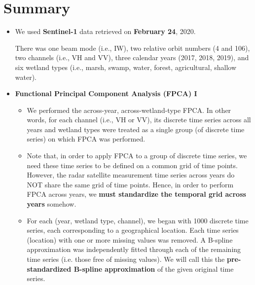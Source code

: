 
\vskip -1.5cm

\section{Summary}
\setcounter{theorem}{0}

\renewcommand{\theenumi}{\roman{enumi}}
\renewcommand{\labelenumi}{\textnormal{(\theenumi)}$\;\;$}


\begin{itemize}
\item
	We used \textbf{\color{red}Sentinel-1} data retrieved on \textbf{\color{red}February 24}, 2020.

	There was one beam mode (i.e., IW),
	two relative orbit numbers (4 and 106),
	two channels (i.e., VH and VV),
	three calendar years (2017, 2018, 2019), and
	six wetland types (i.e., marsh, swamp, water, forest, agricultural, shallow water).

\item
	\textbf{Functional Principal Component Analysis (FPCA) I}
	\begin{itemize}

	\item
		We performed the across-year, across-wetland-type FPCA.
		In other words, for each channel (i.e., VH or VV), its discrete time series
		across all years and wetland types were treated as a single group (of discrete time series)
		on which FPCA was performed.

	\item
		Note that, in order to apply FPCA to a group of discrete time series,
		we need these time series to be defined on a common grid of time points.
		However, the radar satellite measurement time series across years do NOT
		share the same grid of time points. 
		Hence, in order to perform FPCA across years, we
		\textbf{\color{red}must standardize the temporal grid across years} somehow.

	\item
		For each (year, wetland type, channel), we began with 1000 discrete time series,
		each corresponding to a geographical location.
		Each time series (location) with one or more missing values was removed.
		A B-spline approximation was independently fitted through each of the remaining time series
		(i.e. those free of missing values).
		We will call this the \textbf{pre-standardized B-spline approximation}
		of the given original time series.


\end{itemize}
\end{itemize}

